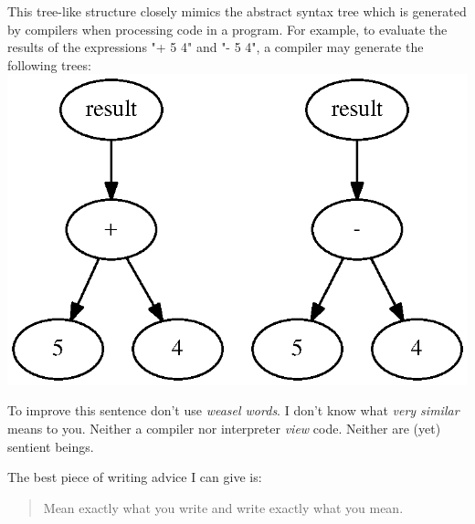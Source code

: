 \documentclass[./Research.tex]{subfiles}
\begin{document}
This tree-like structure closely mimics the abstract syntax tree which is generated by compilers when processing code in a program. For example, to evaluate the results of the expressions "+ 5 4" and "- 5 4", a compiler may generate the following trees: \\

\includegraphics[scale=1]{Visuals/NeuralNetwork_1_SyntaxTree.ps}

{\color{red}
   To improve this sentence don't use \emph{weasel words}. I don't know what \emph{very similar} means to you. Neither a compiler nor interpreter \emph{view} code. Neither are (yet) sentient beings. 
   
   The best piece of writing advice I can give is: 
   \begin{quote}
       Mean exactly what you write and write exactly what you mean. 
   \end{quote}
}
\end{document}

